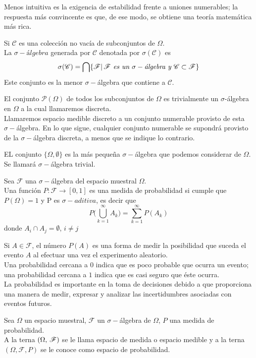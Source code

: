 Menos intuitiva es la exigencia de estabilidad frente a uniones numerables; la respuesta más
convincente es que, de ese modo, se obtiene una teoría matemática más rica.
\begin{Def}
    Si $\mathscr{C}$ es una colección no vacía de subconjuntos de $\Omega$.\\La $\sigma-\textit{álgebra}$ generada por $\mathscr{C}$ denotada por $\sigma(\mathscr{C})$ es $$\sigma(\mathscr{C})=\bigcap\{\mathscr{F}|\thinspace\mathscr{F} \textit{ es un }\sigma-\textit{álgebra y }  \mathscr{C}\subset\mathscr{F}\}$$
    Este conjunto es la menor $\sigma-$álgebra que contiene a $\mathscr{C}$.
\end{Def}
\begin{Ejm}
    El conjunto $\mathscr{P}(\Omega)$ de todos los subconjuntos de $\Omega$ es trivialmente un $\sigma$-álgebra en $\Omega$ a la cual llamaremos discreta. \\ Llamaremos espacio medible discreto a un conjunto numerable provisto de esta $\sigma-$álgebra. En lo que sigue, cualquier conjunto numerable se supondrá provisto de la $\sigma-$álgebra discreta, a menos que se indique lo contrario.
\end{Ejm}
\begin{Ejm}
    EL conjunto $\{\Omega, \emptyset\}$ es la más pequeña $\sigma-$álgebra que podemos considerar de $\Omega$. Se llamará $\sigma-$álgebra trivial.
\end{Ejm}
\begin{Def}
    \label{def-medidaProbabilidad}
    Sea $\mathscr{F}$ una $\sigma-$álgebra del espacio muestral $\Omega$.\\
    Una función $P:\mathscr{F}\rightarrow [0,1]$ es una medida de probabilidad si cumple que $P(\Omega)=1$ y P es $\sigma-aditiva$, es decir que $$P\big(\bigcup_{k=1}^\infty A_k\big)=\sum_{k=1}^\infty P(A_k)$$
    donde $A_i\cap A_j=\emptyset$, $i\not= j$
\end{Def}
Si $A\in\mathscr{F}$, el número $P(A)$ es una forma de medir la posibilidad que suceda el evento $A$ al efectuar una vez el experimento aleatorio.\\
Una probabilidad cercana a $0$ indica que es poco probable que ocurra un evento; una probabilidad cercana a $1$ indica que es casi seguro que éste ocurra.\\
La probabilidad es importante en la toma de decisiones debido a que proporciona una manera de medir, expresar y analizar las incertidumbres asociadas con eventos futuros.
\begin{Def}
    Sea $\Omega$ un espacio muestral, $\mathscr{F}$ un $\sigma-$álgebra de $\Omega$, $P$ una medida de probabilidad.\\
    A la terna $(\Omega,\thinspace\mathscr{F})$ se le llama espacio de medida o espacio medible y a la terna $(\Omega,\mathscr{F},P)$ se le conoce como espacio de probabilidad.
\end{Def}